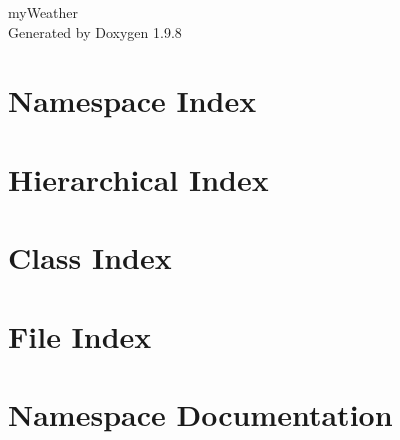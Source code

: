 \documentclass[twoside]{book}
\newcommand{\+}{\discretionary{\mbox{\scriptsize$\hookleftarrow$}}{}{}}
\newcommand{\clearemptydoublepage}{%
    \newpage{\pagestyle{empty}\cleardoublepage}%
  }
\begin{document}
  \raggedbottom
    \hypersetup{pageanchor=false,
                bookmarksnumbered=true,
                pdfencoding=unicode
               }
  \begin{titlepage}
  \vspace*{7cm}
  \begin{center}%
  {\Large my\+Weather}\\
  \vspace*{1cm}
  {\large Generated by Doxygen 1.9.8}\\
  \end{center}
  \end{titlepage}
  \clearemptydoublepage
  \tableofcontents
  \clearemptydoublepage
  \hypersetup{pageanchor=true}
\chapter{Namespace Index}

\chapter{Hierarchical Index}

\chapter{Class Index}

\chapter{File Index}

\chapter{Namespace Documentation}









\end{document}
